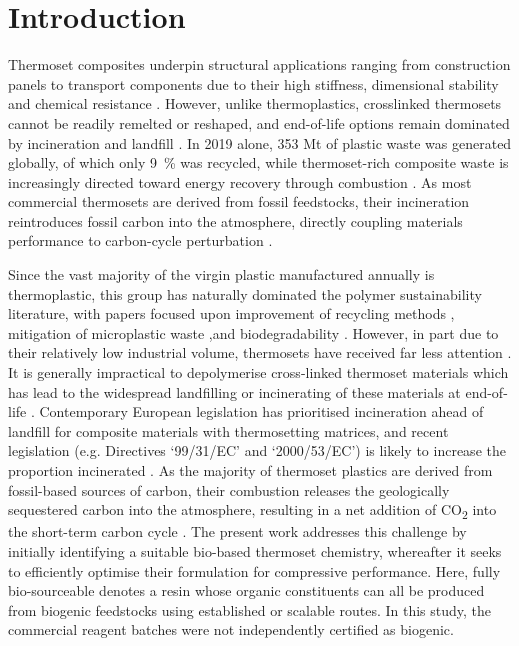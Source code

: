 \section{Introduction}
Thermoset composites underpin structural applications ranging from
 construction panels to transport components due to their high stiffness,
 dimensional stability and chemical resistance \autocite{Gilbert2017}.
However, unlike thermoplastics, crosslinked thermosets cannot be readily
 remelted or reshaped, and end-of-life options remain dominated by
 incineration and landfill \autocite{OWID202507121456}.
In 2019 alone, 353 Mt of plastic waste was generated
 globally, of which only 9~\unit{\percent} was recycled, while 
 thermoset-rich composite waste is increasingly directed toward energy
 recovery through combustion \autocite{OWID202507121456}.
As most commercial thermosets are derived from fossil 
 feedstocks, their incineration reintroduces fossil carbon into the 
 atmosphere, directly coupling materials performance to carbon-cycle 
 perturbation \autocite{Eriksson2009}.

Since the vast majority of the virgin plastic manufactured annually
 is thermoplastic, this group has naturally dominated the polymer 
 sustainability literature, with papers focused upon improvement of 
 recycling methods \autocite{Jagadeesh2022}, mitigation of microplastic 
 waste \autocite{Nafea2024},and biodegradability \autocite{Moshood2022}.
However, in part due to their relatively low industrial volume, thermosets
 have received far less attention \autocite{Liu2021}.
It is generally impractical to depolymerise cross-linked thermoset
 materials which has lead to the widespread landfilling
 or incinerating of these materials at end-of-life
 \autocite{Utekar2021,Chen2023,Topham2019}.
Contemporary European legislation has prioritised incineration ahead
 of landfill for composite materials with thermosetting matrices, 
 and recent legislation (e.g. Directives `99/31/EC' and 
 `2000/53/EC') is likely to increase the proportion incinerated
 \autocite{Pickering2006}.
As the majority of thermoset plastics are derived from fossil-based
 sources of carbon, their combustion releases the geologically 
 sequestered carbon into the atmosphere, resulting in a net addition
 of CO\textsubscript{2} into the short-term carbon cycle 
 \autocite{Levi2018}.
The present work addresses this challenge by initially identifying a
 suitable bio-based thermoset chemistry, whereafter it seeks to
 efficiently optimise their formulation for compressive performance.
Here, fully bio-sourceable denotes a resin whose organic constituents
 can all be produced from biogenic feedstocks using established or
 scalable routes.
In this study, the commercial reagent batches were not independently
 certified as biogenic.

